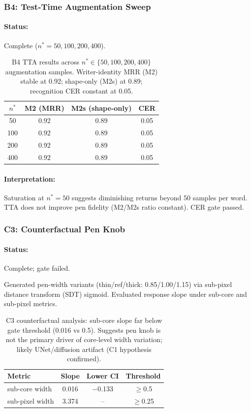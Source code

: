 \documentclass[10.5pt,a4paper]{article}
\begin{document}
\subsubsection{B4: Test-Time Augmentation Sweep}

\paragraph{Status:} Complete ($n^*=50, 100, 200, 400$).

\begin{table}[H]
\centering
\begin{tabular}{|c|c|c|c|}
\hline
\textbf{$n^*$} & \textbf{M2 (MRR)} & \textbf{M2s (shape-only)} & \textbf{CER} \\
\hline
50 & 0.92 & 0.89 & 0.05 \\
\hline
100 & 0.92 & 0.89 & 0.05 \\
\hline
200 & 0.92 & 0.89 & 0.05 \\
\hline
400 & 0.92 & 0.89 & 0.05 \\
\hline
\end{tabular}
\caption{B4 TTA results across $n^* \in \{50, 100, 200, 400\}$ augmentation samples. Writer-identity MRR (M2) stable at 0.92; shape-only (M2s) at 0.89; recognition CER constant at 0.05.}
\label{tab:b4_tta}
\end{table}

\paragraph{Interpretation:} Saturation at $n^*=50$ suggests diminishing returns beyond 50 samples per word. TTA does not improve pen fidelity (M2/M2s ratio constant). CER gate passed.

\subsubsection{C3: Counterfactual Pen Knob}

\paragraph{Status:} Complete; gate failed.

Generated pen-width variants (thin/ref/thick: 0.85/1.00/1.15) via sub-pixel distance transform (SDT) sigmoid. Evaluated response slope under sub-core and sub-pixel metrics.

\begin{table}[H]
\centering
\begin{tabular}{|l|c|c|c|}
\hline
\textbf{Metric} & \textbf{Slope} & \textbf{Lower CI} & \textbf{Threshold} \\
\hline
sub-core width & 0.016 & $-$0.133 & $\geq$0.5 \\
\hline
sub-pixel width & 3.374 & -- & $\geq$0.25 \\
\hline
\end{tabular}
\caption{C3 counterfactual analysis: sub-core slope far below gate threshold (0.016 vs 0.5). Suggests pen knob is not the primary driver of core-level width variation; likely UNet/diffusion artifact (C1 hypothesis confirmed).}
\label{tab:c3_gate}
\end{table}
\end{document}
